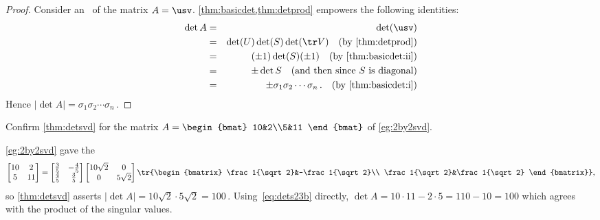 \begin{proof} 
Consider an \svd\ of the matrix \(A=\usv\).
\cref{thm:basicdet,thm:detprod} empowers the following identities:
\begin{eqnarray*}
\det A&=&\det(\usv)
\\&=&\det(U)\det(S)\det(\tr V)
\quad(\text{by \autoref{thm:detprod}})
\\&=&(\pm 1)\det(S)(\pm 1)
\quad(\text{by \autoref{thm:basicdet:ii}})
\\&=&\pm \det S
\quad(\text{and then since \(S\) is diagonal})
\\&=&\pm \sigma_1\sigma_2\cdots\sigma_n\,.
\quad(\text{by \autoref{thm:basicdet:i}})
\end{eqnarray*}
Hence \(|\det A|=\sigma_1\sigma_2\cdots\sigma_n\)\,.
\end{proof}

\begin{example} 
Confirm \autoref{thm:detsvd} for the matrix \(A=\begin{bmat} 10&2\\5&11 \end{bmat}\) of \autoref{eg:2by2svd}.
\begin{solution} 
\autoref{eg:2by2svd} gave the \svd
\begin{equation*}
\begin{bmatrix} 10&2\\5&11 \end{bmatrix}=
\begin{bmatrix} \frac35&-\frac45\\\frac45&\frac35 \end{bmatrix}
\begin{bmatrix} 10\sqrt2&0\\0&5\sqrt2 \end{bmatrix}
\tr{\begin{bmatrix} \frac1{\sqrt2}&-\frac1{\sqrt2}\\ \frac1{\sqrt2}&\frac1{\sqrt2} \end{bmatrix}},
\end{equation*}
so \autoref{thm:detsvd} asserts \(|\det A|=10\sqrt2\cdot5\sqrt 2=100\)\,.
Using~\eqref{eq:dets23b} directly, \(\det A=10\cdot11-2\cdot 5=110-10=100\) which agrees with the product of the singular values.
\end{solution}
\end{example}






